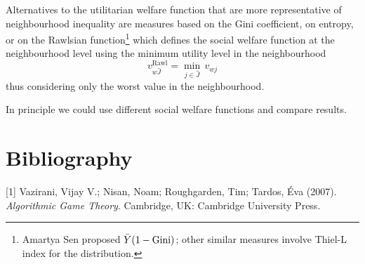 \documentclass{article}
\begin{document}
Alternatives to the utilitarian welfare function that are more representative of neighbourhood inequality  are measures based on the Gini coefficient, on entropy, or on the Rawlsian function\footnote{ Amartya Sen proposed $\Bar{Y}(1-\text{Gini})$; other similar measures involve Thiel-L index for the distribution.} which defines the social welfare function at the neighbourhood level using the minimum utility level in the neighbourhood
\[v^{\text{Rawl}}_{w\hat{J}} = \min_{j \in \hat{J}} \, v_{wj} \]
thus considering only the worst value in the neighbourhood.

In principle we could use different social welfare functions and compare results.

\section{Bibliography}
[1] Vazirani, Vijay V.; Nisan, Noam; Roughgarden, Tim; Tardos, Éva (2007). \textit{Algorithmic Game Theory}. Cambridge, UK: Cambridge University Press.
\end{document}
